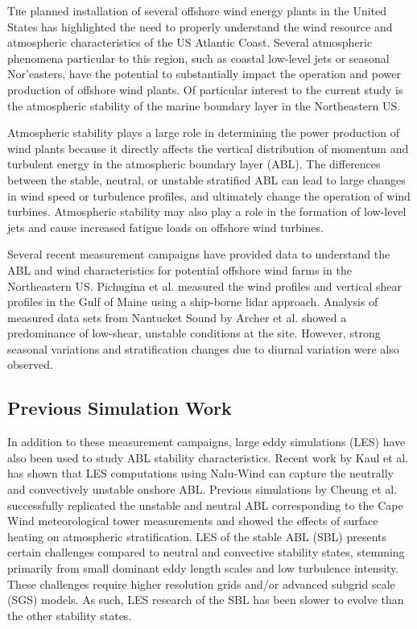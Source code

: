 \documentclass[conf]{new-aiaa}
\begin{document}
\lettrine{T}he planned installation of several offshore wind energy
plants in the United States has highlighted the need to properly
understand the wind resource and atmospheric characteristics of the US
Atlantic Coast.  Several atmospheric phenomena particular to this
region, such as coastal low-level jets or seasonal Nor’easters, have
the potential to substantially impact the operation and power
production of offshore wind plants.  Of particular interest to the
current study is the atmospheric stability of the marine boundary
layer in the Northeastern US.

Atmospheric stability plays a large role in determining the power
production of wind plants because it directly affects the vertical
distribution of momentum and turbulent energy in the atmospheric
boundary layer (ABL).  The differences between the stable, neutral, or
unstable stratified ABL can lead to large changes in wind speed or
turbulence profiles, and ultimately change the operation of wind
turbines.  Atmospheric stability may also play a role in the formation
of low-level jets \cite{nunalee2014mesoscale} and cause increased
fatigue loads on offshore wind turbines.

Several recent measurement campaigns have provided data to understand
the ABL and wind characteristics for potential offshore wind farms in
the Northeastern US.  Pichugina et al. \cite{pichugina2017properties}
measured the wind profiles and vertical shear profiles in the Gulf of
Maine using a ship-borne lidar approach.  Analysis of measured data
sets from Nantucket Sound by Archer et
al. \cite{archer2016predominance} showed a predominance of low-shear,
unstable conditions at the site.  However, strong seasonal variations
and stratification changes due to diurnal variation were also
observed.

\subsection{Previous Simulation Work}

In addition to these measurement campaigns, large eddy simulations (LES) have
also been used to study ABL stability characteristics.  Recent work by
Kaul et al. \cite{kaul2020large} has shown that LES computations using
Nalu-Wind can capture the neutrally and convectively unstable onshore
ABL.  Previous simulations by Cheung et al. \cite{cheung2020large}
successfully replicated the unstable and neutral ABL corresponding to
the Cape Wind meteorological tower measurements
\cite{archer2016predominance} and showed the effects of surface
heating on atmospheric stratification. LES of the stable ABL (SBL) presents 
certain challenges compared to neutral and convective stability states, stemming 
primarily from small dominant eddy length scales and low turbulence intensity. 
These challenges require higher resolution grids and/or advanced subgrid 
scale (SGS) models. As such, LES research of the SBL has been slower 
to evolve than the other stability states.  
\end{document}
